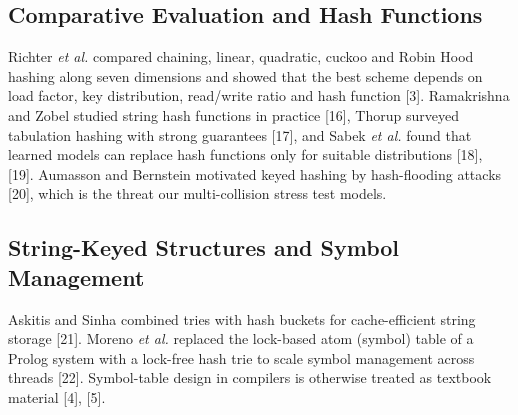 \documentclass{ieeeaccess}
\begin{document}
\subsection{Comparative Evaluation and Hash Functions}

Richter \emph{et al.} compared chaining, linear, quadratic, cuckoo and Robin Hood hashing along seven dimensions and showed that the best scheme depends on load factor, key distribution, read/write ratio and hash function [3]. Ramakrishna and Zobel studied string hash functions in practice [16], Thorup surveyed tabulation hashing with strong guarantees [17], and Sabek \emph{et al.} found that learned models can replace hash functions only for suitable distributions [18], [19]. Aumasson and Bernstein motivated keyed hashing by hash-flooding attacks [20], which is the threat our multi-collision stress test models.

\subsection{String-Keyed Structures and Symbol Management}

Askitis and Sinha combined tries with hash buckets for cache-efficient string storage [21]. Moreno \emph{et al.} replaced the lock-based atom (symbol) table of a Prolog system with a lock-free hash trie to scale symbol management across threads [22]. Symbol-table design in compilers is otherwise treated as textbook material [4], [5].
\end{document}
